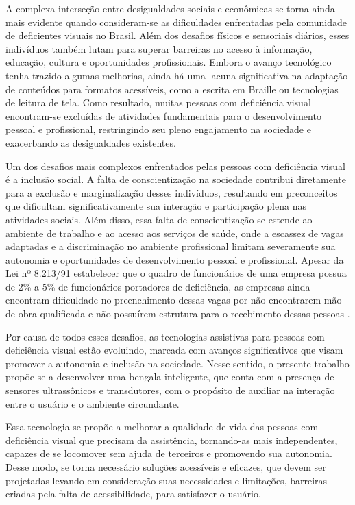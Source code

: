 A complexa interseção entre desigualdades sociais e econômicas se torna ainda mais evidente quando consideram-se as dificuldades enfrentadas pela comunidade de deficientes visuais no Brasil. Além dos desafios físicos e sensoriais diários, esses indivíduos também lutam para superar barreiras no acesso à informação, educação, cultura e oportunidades profissionais. Embora o avanço tecnológico tenha trazido algumas melhorias, ainda há uma lacuna significativa na adaptação de conteúdos para formatos acessíveis, como a escrita em Braille ou tecnologias de leitura de tela. Como resultado, muitas pessoas com deficiência visual encontram-se excluídas de atividades fundamentais para o desenvolvimento pessoal e profissional, restringindo seu pleno engajamento na sociedade e exacerbando as desigualdades existentes.

Um dos desafios mais complexos enfrentados pelas pessoas com deficiência visual é a inclusão social. A falta de conscientização na sociedade contribui diretamente para a exclusão e marginalização desses indivíduos, resultando em preconceitos que dificultam significativamente sua interação e participação plena nas atividades sociais. Além disso, essa falta de conscientização se estende ao ambiente de trabalho e ao acesso aos serviços de saúde, onde a escassez de vagas adaptadas e a discriminação no ambiente profissional limitam severamente sua autonomia e oportunidades de desenvolvimento pessoal e profissional. Apesar da Lei nº 8.213/91 estabelecer que o quadro de funcionários de uma empresa possua de 2\% a 5\% de funcionários portadores de deficiência, as empresas ainda encontram dificuldade no preenchimento dessas vagas por não encontrarem mão de obra qualificada e não possuírem estrutura para o recebimento dessas pessoas \cite{pcd-mercado-trabalho-2}. 

Por causa de todos esses desafios, as tecnologias assistivas para pessoas com deficiência visual estão evoluindo, marcada com avanços significativos que visam promover a autonomia e inclusão na sociedade. Nesse sentido, o presente trabalho propõe-se a desenvolver uma bengala inteligente, que conta com a presença de sensores ultrassônicos e transdutores, com o propósito de auxiliar na interação entre o usuário e o ambiente circundante.

Essa tecnologia se propõe a melhorar a qualidade de vida das pessoas com deficiência visual que precisam da assistência, tornando-as mais independentes, capazes de se locomover sem ajuda de terceiros e promovendo sua autonomia. Desse modo, se torna necessário soluções acessíveis e eficazes, que devem ser projetadas levando em consideração suas necessidades e limitações, barreiras criadas pela falta de acessibilidade, para satisfazer o usuário.


